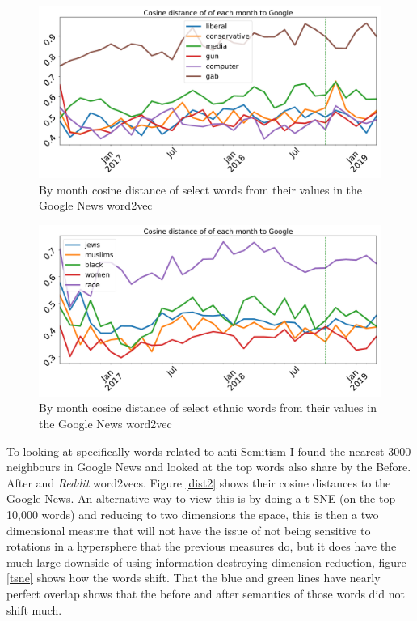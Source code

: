 \documentclass[letterpaper]{article}
\begin{document}
\begin{figure}[h!]
	\centering
	\includegraphics[width=1\textwidth]{sim_misc_jewish.pdf}
	\caption{By month cosine distance of select words from their values in the Google News word2vec }\label{randaling}
\end{figure}

\begin{figure}[h!]
	\centering
	\includegraphics[width=1\textwidth]{sim_ethnic_jewish.pdf}
	\caption{By month cosine distance of select ethnic words from their values in the Google News word2vec }\label{eth}
\end{figure}

To looking at specifically words related to anti-Semitism I found the nearest 3000 neighbours in Google News and looked at the top words also share by the Before. After and \textit{Reddit} word2vecs. Figure \ref{dist2} shows their cosine distances to the Google News. An alternative way to view this is by doing a t-SNE (on the top 10,000 words) and reducing to two dimensions the space, this is then a two dimensional measure that will not have the issue of not being sensitive to rotations in a hypersphere that the previous measures do, but it does have the much large downside of using information destroying dimension reduction, figure \ref{tsne} shows how the words shift. That the blue and green lines have nearly perfect overlap shows that the before and after semantics of those words did not shift much. 
\end{document}

